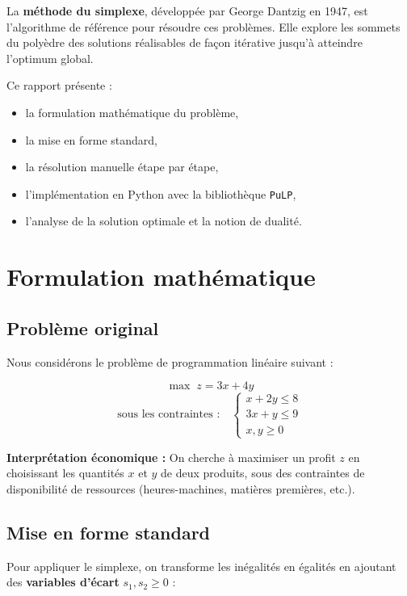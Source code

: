\documentclass[12pt,a4paper]{article}
\begin{document}
La \textbf{méthode du simplexe}, développée par George Dantzig en 1947, 
est l'algorithme de référence pour résoudre ces problèmes. Elle explore 
les sommets du polyèdre des solutions réalisables de façon itérative 
jusqu'à atteindre l'optimum global.

\medskip
Ce rapport présente :
\begin{itemize}[noitemsep]
  \item la formulation mathématique du problème,
  \item la mise en forme standard,
  \item la résolution manuelle étape par étape,
  \item l'implémentation en Python avec la bibliothèque \texttt{PuLP},
  \item l'analyse de la solution optimale et la notion de dualité.
\end{itemize}

\section{Formulation mathématique}

\subsection{Problème original}

Nous considérons le problème de programmation linéaire suivant :

\[
  \max \; z = 3x + 4y
\]
\[
  \text{sous les contraintes :} \quad
  \begin{cases}
    x + 2y \leq 8 \\
    3x + y  \leq 9 \\
    x, y \geq 0
  \end{cases}
\]

\textbf{Interprétation économique :} On cherche à maximiser un profit $z$ 
en choisissant les quantités $x$ et $y$ de deux produits, sous des 
contraintes de disponibilité de ressources (heures-machines, matières 
premières, etc.).

\subsection{Mise en forme standard}

Pour appliquer le simplexe, on transforme les inégalités en égalités en 
ajoutant des \textbf{variables d'écart} $s_1, s_2 \geq 0$ :
\end{document}
